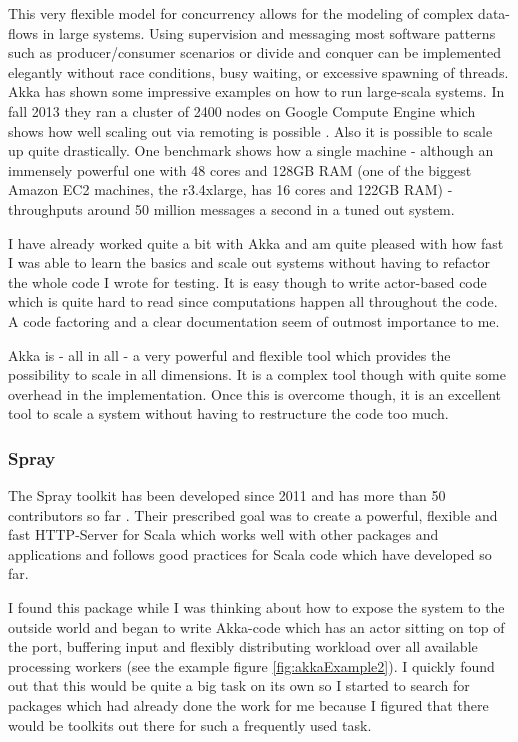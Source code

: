 \documentclass[11p]{scrartcl}
\begin{document}
This very flexible model for concurrency allows for the modeling of complex data-flows in large systems. Using supervision and messaging most software patterns such as producer/consumer scenarios or divide and conquer can be implemented elegantly without race conditions, busy waiting, or excessive spawning of threads. Akka has shown some impressive examples on how to run large-scala systems. In fall 2013 they ran a cluster of 2400 nodes on Google Compute Engine which shows how well scaling out via remoting is possible \cite{link:akkaCluster}. Also it is possible to scale up quite drastically. One benchmark shows how a single machine - although an immensely powerful one with 48 cores and 128GB RAM (one of the biggest Amazon EC2 machines, the r3.4xlarge, has 16 cores and 122GB RAM) \cite{link:ec2Pricing} - throughputs around 50 million messages a second in a tuned out system. \cite{link:akkaScaleUp}

I have already worked quite a bit with Akka and am quite pleased with how fast I was able to learn the basics and scale out systems without having to refactor the whole code I wrote for testing. It is easy though to write actor-based code which is quite hard to read since computations happen all throughout the code. A code factoring and a clear documentation seem of outmost importance to me.

Akka is - all in all - a very powerful and flexible tool which provides the possibility to scale in all dimensions. It is a complex tool though with quite some overhead in the implementation. Once this is overcome though, it is an excellent tool to scale a system without having to restructure the code too much.


\subsubsection{Spray}
The Spray toolkit has been developed since 2011 \cite{link:sprayChangelog} and has more than 50 contributors so far \cite{link:sprayGithub}. Their prescribed goal was to create a powerful, flexible and fast HTTP-Server for Scala which works well with other packages and applications and follows good practices for Scala code which have developed so far.

I found this package while I was thinking about how to expose the system to the outside world and began to write Akka-code which has an actor sitting on top of the port, buffering input and flexibly distributing workload over all available processing workers (see the example figure \ref{fig:akkaExample2}). I quickly found out that this would be quite a big task on its own so I started to search for packages which had already done the work for me because I figured that there would be toolkits out there for such a frequently used task. 
\end{document}
